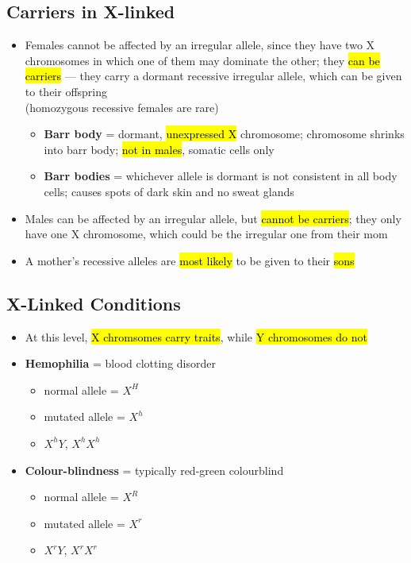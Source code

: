 \documentclass[a4paper,12pt]{article}
\begin{document}
\subsection{Carriers in X-linked}
\begin{itemize}
    \item{
            Females cannot be affected by an irregular allele, since they have two X chromosomes in which one of them may dominate the other; they \hl{can be carriers} --- they carry a dormant recessive irregular allele, which can be given to their offspring \\ (homozygous recessive females are rare)
            \begin{itemize}
                \item{\textbf{Barr body} = dormant, \hl{unexpressed X} chromosome; chromosome shrinks into barr body; \hl{not in males}, somatic cells only}
                \item{\textbf{Barr bodies} = whichever allele is dormant is not consistent in all body cells; causes spots of dark skin and no sweat glands}
            \end{itemize}
        }
    \item{Males can be affected by an irregular allele, but \hl{cannot be carriers}; they only have one X chromosome, which could be the irregular one from their mom}
    \item{A mother's recessive alleles are \hl{most likely} to be given to their \hl{sons}}
\end{itemize}

\pagebreak

\subsection{X-Linked Conditions}
\begin{itemize}
    \item{At this level, \hl{X chromsomes carry traits}, while \hl{Y chromosomes do not}}
    \item{
            \textbf{Hemophilia} = blood clotting disorder
            \begin{itemize}
                \item{normal allele = $X^H$}
                \item{mutated allele = $X^h$}
                \item{$X^hY$, $X^hX^h$}
            \end{itemize}
        }
    \item{
            \textbf{Colour-blindness} = typically red-green colourblind
            \begin{itemize}
                \item{normal allele = $X^R$}
                \item{mutated allele = $X^r$}
                \item{$X^rY$, $X^rX^r$}
            \end{itemize}
        }
\end{itemize}
\end{document}
